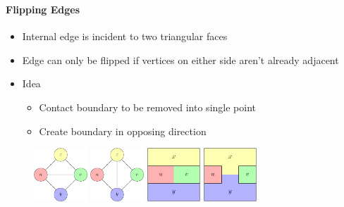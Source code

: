 \documentclass[t,18pt]{beamer}
\begin{document}
\begin{frame}
  \frametitle{}
  \framesubtitle{Flipping Edges}
  \begin{itemize}
    \item Internal edge is incident to two triangular faces
    \item Edge can only be flipped if vertices on either side aren’t already adjacent
    \item Idea \begin{itemize}
      \item Contact boundary to be removed into single point
      \item Create boundary in opposing direction
    \end{itemize}
  \end{itemize}
  \begin{figure}
    \includegraphics[height=2cm]{../Thesis/Resources/FlipEdge-Example-Internal-1.pdf}
    \quad
    \includegraphics[height=2cm]{../Thesis/Resources/FlipEdge-Example-Internal-2.pdf}
    \quad
    \includegraphics[height=2cm]{../Thesis/Resources/FlipEdge-Example-Internal-3.pdf}
    \quad
    \includegraphics[height=2cm]{../Thesis/Resources/FlipEdge-Example-Internal-4.pdf}
  \end{figure}
\end{frame}
\end{document}

